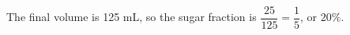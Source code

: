 The final volume is 125 mL, so the sugar fraction is $\dfrac{25}{125}=\dfrac{1}{5}$, or $\boxed{20\%}$.
